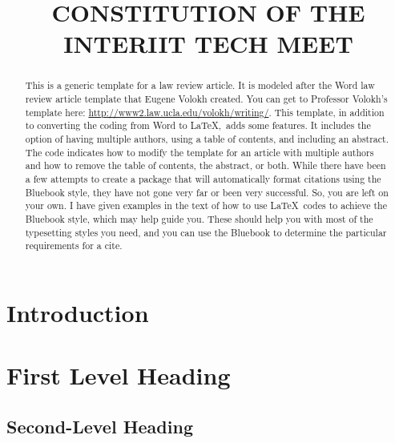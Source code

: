 \documentclass[letterpaper,12pt,twoside]{article}
\title{\Huge{\uppercase{\textbf{Constitution of the InterIIT Tech Meet}}}}
\date{} %
\begin{document}

\maketitle
\newpage
\thispagestyle{empty}

	\begin{abstract}
	This is a generic template for a law review article. It is modeled after the Word law review article template that Eugene Volokh created. You can get to Professor Volokh's template here: \url{http://www2.law.ucla.edu/volokh/writing/}. This template, in addition to converting the coding from Word to \LaTeX,~adds some features. It includes the option of having multiple authors, using a table of contents, and including an abstract. The code indicates how to modify the template for an article with multiple authors and how to remove the table of contents, the abstract, or both. While there have been a few attempts to create a package that will automatically format citations using the Bluebook style, they have not gone very far or been very successful. So, you are left on your own. I have given examples in the text of how to use \LaTeX~codes to achieve the Bluebook style, which may help guide you. These should help you with most of the typesetting styles you need, and you can use the Bluebook to determine the particular requirements for a cite. 
	\end{abstract}

\tableofcontents %
\vspace{14pt}
\clearpage

\section*{Introduction}

\lipsum[1-2] %

\section{First Level Heading}

\lipsum[1]

	\begin{quote}
		\lipsum[2]
	\end{quote}

\subsection{Second-Level Heading}
\end{document}
